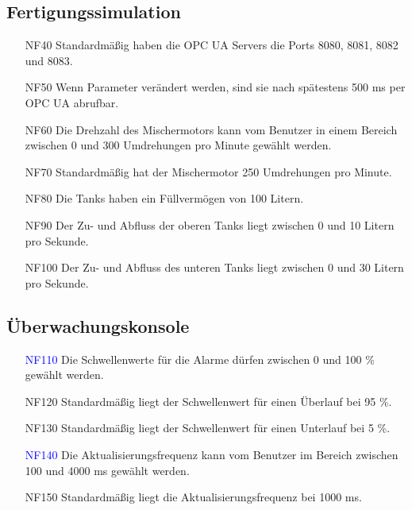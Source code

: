 \documentclass[parskip=full]{scrartcl}
\begin{document}
\subsection{Fertigungssimulation}
\begin{enumerate}
  \item[NF40] Standardmäßig haben die \glspl{OPC UA Server} die Ports 8080, 8081, 8082 und 8083.
  \item[NF50] Wenn Parameter verändert werden, sind sie nach spätestens 500 ms per \gls{OPC UA} abrufbar.
  \item[NF60] Die Drehzahl des Mischermotors kann vom Benutzer in einem Bereich zwischen 0 und 300 Umdrehungen pro Minute gewählt werden.
  \item[NF70] Standardmäßig hat der Mischermotor 250 Umdrehungen pro Minute.
  \item[NF80] Die Tanks haben ein Füllvermögen von 100 Litern.
  \item[NF90] Der Zu- und Abfluss der oberen Tanks liegt zwischen 0 und 10 Litern pro Sekunde.
  \item[NF100] Der Zu- und Abfluss des unteren Tanks liegt zwischen 0 und 30 Litern pro Sekunde.
\end{enumerate}

\subsection{Überwachungskonsole}
\begin{enumerate}
  \item[\textcolor{blue}{NF110}] Die Schwellenwerte für die Alarme dürfen zwischen 0 und 100 \% gewählt werden.
  \item[NF120] Standardmäßig liegt der Schwellenwert für einen Überlauf bei 95 \%.
  \item[NF130] Standardmäßig liegt der Schwellenwert für einen Unterlauf bei 5 \%.
  \item[\textcolor{blue}{NF140}] Die Aktualisierungsfrequenz kann vom Benutzer im Bereich zwischen 100 und 4000 ms gewählt werden.
  \item[NF150] Standardmäßig liegt die Aktualisierungsfrequenz bei 1000 ms.
\end{enumerate}

\pagebreak
\end{document}
